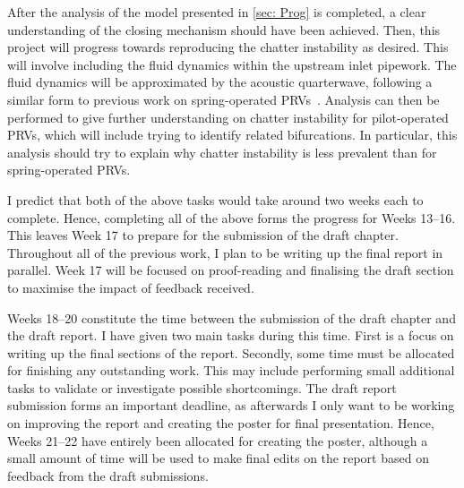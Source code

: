 After the analysis of the model presented in \cref{sec: Prog} is completed, a clear understanding of the closing mechanism should have been achieved. Then, this project will progress towards reproducing the chatter instability as desired. This will involve including the fluid dynamics within the upstream inlet pipework. The fluid dynamics will be approximated by the acoustic quarterwave, following a similar form to previous work on spring-operated PRVs~\cite{Hos2015DynamicModelling}. Analysis can then be performed to give further understanding on chatter instability for pilot-operated PRVs, which will include trying to identify related bifurcations. In particular, this analysis should try to explain why chatter instability is less prevalent than for spring-operated PRVs.

I predict that both of the above tasks would take around two weeks each to complete. Hence, completing all of the above forms the progress for Weeks 13--16. This leaves Week 17 to prepare for the submission of the draft chapter. Throughout all of the previous work, I plan to be writing up the final report in parallel. Week 17 will be focused on proof-reading and finalising the draft section to maximise the impact of feedback received.

Weeks 18--20 constitute the time between the submission of the draft chapter and the draft report. I have given two main tasks during this time. First is a focus on writing up the final sections of the report. Secondly, some time must be allocated for finishing any outstanding work. This may include performing small additional tasks to validate or investigate possible shortcomings. The draft report submission forms an important deadline, as afterwards I only want to be working on improving the report and creating the poster for final presentation. Hence, Weeks 21--22 have entirely been allocated for creating the poster, although a small amount of time will be used to make final edits on the report based on feedback from the draft submissions.